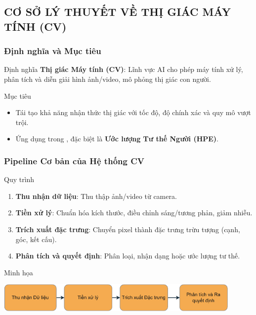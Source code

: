 \subsection{CƠ SỞ LÝ THUYẾT VỀ THỊ GIÁC MÁY TÍNH (CV)}
\begin{frame}
\frametitle{Định nghĩa và Mục tiêu}
\begin{block}{Định nghĩa}
\textbf{Thị giác Máy tính (CV)}: Lĩnh vực AI cho phép máy tính xử lý, phân tích và diễn giải hình ảnh/video, mô phỏng thị giác con người.
\end{block}

\begin{block}{Mục tiêu}
\begin{itemize}
\item Tái tạo khả năng nhận thức thị giác với tốc độ, độ chính xác và quy mô vượt trội.
\item Ứng dụng trong \TENLUANVAN, đặc biệt là \textbf{Ước lượng Tư thế Người (HPE)}.
\end{itemize}
\end{block}
\end{frame}

\begin{frame}
\frametitle{Pipeline Cơ bản của Hệ thống CV}
\begin{block}{Quy trình}
\begin{enumerate}
\item \textbf{Thu nhận dữ liệu}: Thu thập ảnh/video từ camera.
\item \textbf{Tiền xử lý}: Chuẩn hóa kích thước, điều chỉnh sáng/tương phản, giảm nhiễu.
\item \textbf{Trích xuất đặc trưng}: Chuyển pixel thành đặc trưng trừu tượng (cạnh, góc, kết cấu).
\item \textbf{Phân tích và quyết định}: Phân loại, nhận dạng hoặc ước lượng tư thế.
\end{enumerate}
\end{block}

\begin{exampleblock}{Minh họa}
\begin{center}
\includegraphics[width=0.9\textwidth]{images/vision_flow-crop.pdf}
\caption{Quy trình tổng thể của hệ thống CV.}
\label{fig:cv_pipeline}
\end{center}
\end{exampleblock}
\end{frame}

